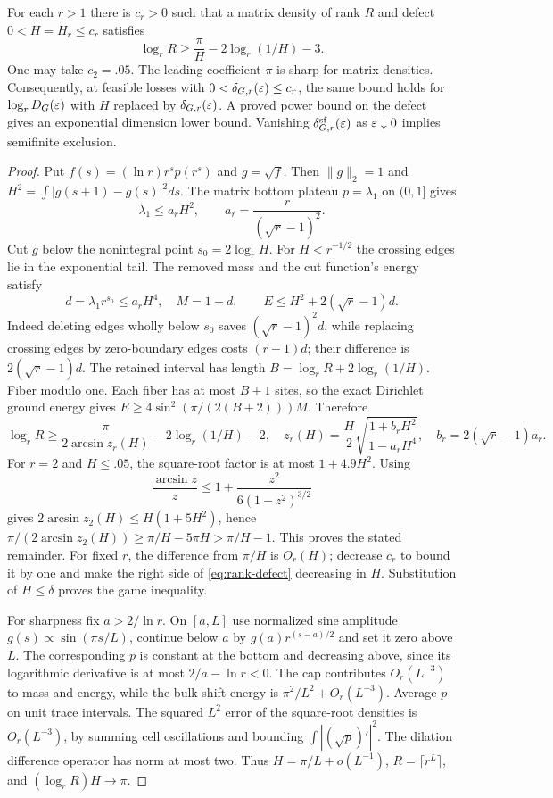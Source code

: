 \begin{theorem}\label{thm:rank-defect}
For each $r>1$ there is $c_r>0$ such that a matrix density of rank $R$ and defect $0<H=H_r\le c_r$ satisfies
\begin{equation}\label{eq:rank-defect}
 \log_r R\ge\frac\pi H-2\log_r(1/H)-3.
\end{equation}
One may take $c_2=.05$. The leading coefficient $\pi$ is sharp for matrix densities. Consequently, at feasible losses with $0<\delta_{G,r}(\varepsilon)\le c_r$, the same bound holds for $\log_r D_G(\varepsilon)$ with $H$ replaced by $\delta_{G,r}(\varepsilon)$. A proved power bound on the defect gives an exponential dimension lower bound. Vanishing $\delta^{\rm sf}_{G,r}(\varepsilon)$ as $\varepsilon\downarrow0$ implies semifinite exclusion.
\end{theorem}
\begin{proof}
Put $f(s)=(\ln r)r^sp(r^s)$ and $g=\sqrt f$. Then $\|g\|_2=1$ and $H^2=\int|g(s+1)-g(s)|^2ds$. The matrix bottom plateau $p=\lambda_1$ on $(0,1]$ gives
\[
 \lambda_1\le a_rH^2,\qquad a_r=\frac r{(\sqrt r-1)^2}.
\]
Cut $g$ below the nonintegral point $s_0=2\log_rH$. For $H<r^{-1/2}$ the crossing edges lie in the exponential tail. The removed mass and the cut function's energy satisfy
\[
 d=\lambda_1r^{s_0}\le a_rH^4,\quad M=1-d,\qquad
 E\le H^2+2(\sqrt r-1)d.
\]
Indeed deleting edges wholly below $s_0$ saves $(\sqrt r-1)^2d$, while replacing crossing edges by zero-boundary edges costs $(r-1)d$; their difference is $2(\sqrt r-1)d$. The retained interval has length $B=\log_rR+2\log_r(1/H)$. Fiber modulo one. Each fiber has at most $B+1$ sites, so the exact Dirichlet ground energy gives $E\ge4\sin^2(\pi/(2(B+2)))M$. Therefore
\[
 \log_rR\ge\frac\pi{2\arcsin z_r(H)}-2\log_r(1/H)-2,
 \quad z_r(H)=\frac H2\sqrt{\frac{1+b_rH^2}{1-a_rH^4}},
 \quad b_r=2(\sqrt r-1)a_r.
\]
For $r=2$ and $H\le.05$, the square-root factor is at most $1+4.9H^2$. Using
\[
 \frac{\arcsin z}{z}\le1+\frac{z^2}{6(1-z^2)^{3/2}}
\]
gives $2\arcsin z_2(H)\le H(1+5H^2)$, hence $\pi/(2\arcsin z_2(H))\ge\pi/H-5\pi H>\pi/H-1$. This proves the stated remainder. For fixed $r$, the difference from $\pi/H$ is $O_r(H)$; decrease $c_r$ to bound it by one and make the right side of \eqref{eq:rank-defect} decreasing in $H$. Substitution of $H\le\delta$ proves the game inequality.

For sharpness fix $a>2/\ln r$. On $[a,L]$ use normalized sine amplitude $g(s)\propto\sin(\pi s/L)$, continue below $a$ by $g(a)r^{(s-a)/2}$ and set it zero above $L$. The corresponding $p$ is constant at the bottom and decreasing above, since its logarithmic derivative is at most $2/a-\ln r<0$. The cap contributes $O_r(L^{-3})$ to mass and energy, while the bulk shift energy is $\pi^2/L^2+O_r(L^{-3})$. Average $p$ on unit trace intervals. The squared $L^2$ error of the square-root densities is $O_r(L^{-3})$, by summing cell oscillations and bounding $\int|(\sqrt p)'|^2$. The dilation difference operator has norm at most two. Thus $H=\pi/L+o(L^{-1})$, $R=\lceil r^L\rceil$, and $(\log_rR)H\to\pi$.


\end{proof}
